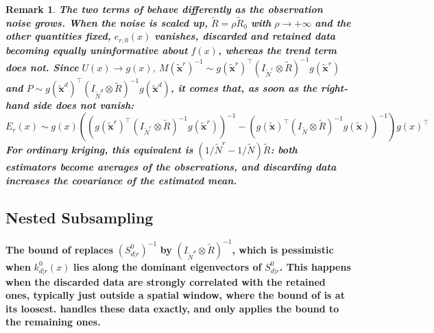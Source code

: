 \documentclass[preprint]{elsarticle}
\newtheorem{remark}{Remark}
\begin{document}
\begin{remark}
    \textbf{The two terms of  behave differently as the observation noise grows. When the noise is scaled up,} $\tilde{R}=\rho\tilde{R}_0$ \textbf{with} $\rho\rightarrow+\infty$ \textbf{and the other quantities fixed,} $e_{r,0}(x)$ \textbf{vanishes, discarded and retained data becoming equally uninformative about} $f(x)$\textbf{, whereas the trend term does not. Since} $U(x)\rightarrow g(x)$, $M(\tilde{\mathbf{x}}^r)^{-1}\sim g(\tilde{\mathbf{x}}^r)^\top\left(I_{\tilde{N}^r}\otimes\tilde{R}\right)^{-1}g(\tilde{\mathbf{x}}^r)$ \textbf{and} $P\sim g(\tilde{\mathbf{x}}^d)^\top\left(I_{\tilde{N}^d}\otimes\tilde{R}\right)^{-1}g(\tilde{\mathbf{x}}^d)$\textbf{, it comes that, as soon as the right-hand side does not vanish:}
    \begin{equation*}
        E_r(x)\sim g(x)\left(\left(g(\tilde{\mathbf{x}}^r)^\top\left(I_{\tilde{N}^r}\otimes\tilde{R}\right)^{-1}g(\tilde{\mathbf{x}}^r)\right)^{-1}-\left(g(\tilde{\mathbf{x}})^\top\left(I_{\tilde{N}}\otimes\tilde{R}\right)^{-1}g(\tilde{\mathbf{x}})\right)^{-1}\right)g(x)^\top
    \end{equation*}
    \textbf{For ordinary kriging, this equivalent is} $\left(1/\tilde{N}^r-1/\tilde{N}\right)\tilde{R}$\textbf{: both estimators become averages of the observations, and discarding data increases the covariance of the estimated mean.}\label{rem:noise_regime}
\end{remark}

\subsection{Nested Subsampling}\label{sec:nested_bound}

\textbf{The bound of  replaces} $\left(S^0_{d|r}\right)^{-1}$ \textbf{by} $\left(I_{\tilde{N}^d}\otimes\tilde{R}\right)^{-1}$\textbf{, which is pessimistic when} $k^0_{d|r}(x)$ \textbf{lies along the dominant eigenvectors of} $S^0_{d|r}$\textbf{. This happens when the discarded data are strongly correlated with the retained ones, typically just outside a spatial window, where the bound of  is at its loosest.  handles these data exactly, and only applies the bound to the remaining ones.}
\end{document}
